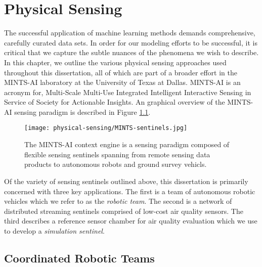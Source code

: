 \chapter{Physical Sensing}

The successful application of machine learning methods demands comprehensive, carefully curated data sets. In order for our modeling efforts to be successful, it is critical that we capture the subtle nuances of the phenomena we wish to describe. In this chapter, we outline the various physical sensing approaches used throughout this dissertation, all of which are part of a broader effort in the MINTS-AI laboratory at the University of Texas at Dallas. MINTS-AI is an acronym for, Multi-Scale Multi-Use Integrated Intelligent Interactive Sensing in Service of Society for Actionable Insights. An graphical overview of the MINTS-AI sensing paradigm is described in Figure \ref{fig:mints-ai}.

\begin{figure}[!hbt]
  \centering
  \texttt{[image: physical-sensing/MINTS-sentinels.jpg]}
  \caption{The MINTS-AI context engine is a sensing paradigm composed of flexible sensing sentinels spanning from remote sensing data products to autonomous robots and ground survey vehicls.}
  \label{fig:mints-ai}
\end{figure}

Of the variety of sensing sentinels outlined above, this dissertation is primarily concerned with three key applications. The first is a team of autonomous robotic vehicles which we refer to as the \textit{robotic team}. The second is a network of distributed streaming sentinels comprised of low-cost air quality sensors. The third describes a reference sensor chamber for air quality evaluation which we use to develop a \textit{simulation sentinel}.



\section{Coordinated Robotic Teams}

